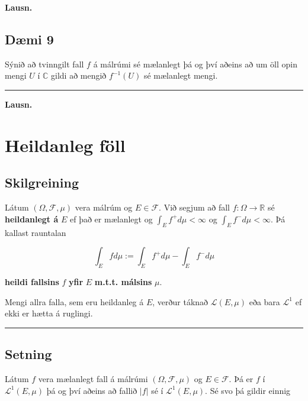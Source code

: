 \documentclass[]{book}
\begin{document}
\textbf{Lausn.}

\hypertarget{dmi-9}{%
\section*{Dæmi 9}\label{dmi-9}}

Sýnið að tvinngilt fall \(f\) á málrúmi sé mælanlegt þá og því aðeins að um öll opin mengi \(U\) í \(\mathbb C\) gildi að mengið \(f^{-1}(U)\) sé mælanlegt mengi.

\begin{center}\rule{0.5\linewidth}{\linethickness}\end{center}

\textbf{Lausn.}

\hypertarget{heildanleg-foll}{%
\chapter{Heildanleg föll}\label{heildanleg-foll}}

\hypertarget{skilgreining-22}{%
\section{Skilgreining}\label{skilgreining-22}}

Látum \((\Omega, \mathcal F, \mu)\) vera málrúm og \(E\in \mathcal F\). Við segjum að fall \(f:\Omega\rightarrow\mathbb R\) sé \textbf{heildanlegt á } \(E\) ef það er mælanlegt og \(\int_E f^+d\mu < \infty\) og \(\int_E f^-d\mu < \infty\). Þá kallast rauntalan

\[
\int_Efd\mu := \int_Ef^+d\mu - \int_Ef^-d\mu
\]

\textbf{heildi fallsins} \(f\) \textbf{yfir} \(E\) \textbf{m.t.t. málsins} \(\mu\).

Mengi allra falla, sem eru heildanleg á \(E\), verður táknað \(\mathcal L(E,\mu)\) eða bara \(\mathcal L^1\) ef ekki er hætta á ruglingi.

\begin{center}\rule{0.5\linewidth}{\linethickness}\end{center}

\hypertarget{setning-50}{%
\section{Setning}\label{setning-50}}

Látum \(f\) vera mælanlegt fall á málrúmi \((\Omega, \mathcal F, \mu)\) og \(E\in \mathcal F\). Þá er \(f\) í \(\mathcal L^1(E, \mu)\) þá og því aðeins að fallið \(|f|\) sé í \(\mathcal L^1(E,\mu)\). Sé svo þá gildir einnig
\end{document}
